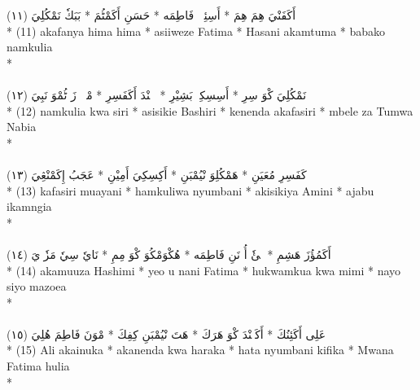\documentclass[a4paper, 12pt]{report}
\begin{document}
\begin{center}
\textarabic{(١١) \textcolor{mygreen}{أَكَفَنْيَ هِمَ هِمَ  * أَسِئِوٖزٖ فَاطِمَه  * حَسَنِ أَكَمْٹُمَ  * بَبَكٗ نَمْكُلِيَ }} \\* 
(11) akafanya hima hima  * asiiweze Fatima  * Hasani akamtuma  * babako namkulia  \\* 
 \\ 
\\[8mm] 

\textarabic{(١٢) \textcolor{mygreen}{نَمْكُلِيَ كْوَ سِرِ  * أَسِسِكِيٖ بَشِيْرِ  * كٖنٖنْدَ أَكَفَسِرِ  * مْبٖلٖ زَ ٹُمْوَ نَبِيَ }} \\* 
(12) namkulia kwa siri  * asisikie Bashiri  * kenenda akafasiri  * mbele za Tumwa Nabia  \\* 
 \\ 
\\[8mm] 

\textarabic{(١٣) \textcolor{mygreen}{كَفَسِرِ مُعَيَنِ  * هَمْكُلِوَ نْيُمْبَنِ  * أَكِسِكِيَ أَمِيْنِ  * عَجَبُ إِكَمْنْڠِيَ }} \\* 
(13) kafasiri muayani  * hamkuliwa nyumbani  * akisikiya Amini  * ajabu ikamngia  \\* 
 \\ 
\\[8mm] 

\textarabic{(١٤) \textcolor{mygreen}{أَكَمُؤُزَ هَشِمِ  * يٖئٗ أُ نَنِ فَاطِمَه  * هُكْوَمْكُوَ كْوَ مِمِ  * نَايٗ سِيٗ مَزٗوٖيَ }} \\* 
(14) akamuuza Hashimi  * yeo u nani Fatima  * hukwamkua kwa mimi  * nayo siyo mazoea  \\* 
 \\ 
\\[8mm] 

\textarabic{(١٥) \textcolor{mygreen}{عَلِى أَكَئِنُكَ  * أَكَنٖنْدَ كْوَ هَرَكَ  * هَتَ نْيُمْبَنِ كِفِكَ  * مْوَنَ فَاطِمَ هُلِيَ }} \\* 
(15) Ali akainuka  * akanenda kwa haraka  * hata nyumbani kifika  * Mwana Fatima hulia  \\* 
 \\ 
\\[8mm] 


\end{center}
\end{document}
